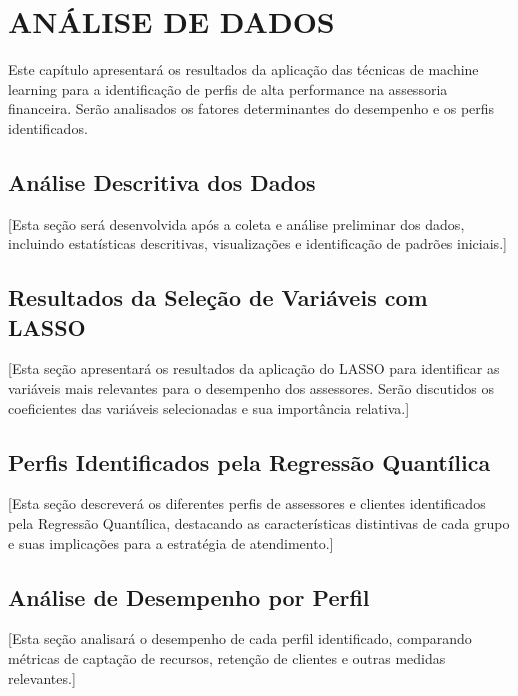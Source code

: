 \chapter{ANÁLISE DE DADOS}

Este capítulo apresentará os resultados da aplicação das técnicas de machine learning para a identificação de perfis de alta performance na assessoria financeira. Serão analisados os fatores determinantes do desempenho e os perfis identificados.

\section{Análise Descritiva dos Dados}

[Esta seção será desenvolvida após a coleta e análise preliminar dos dados, incluindo estatísticas descritivas, visualizações e identificação de padrões iniciais.]

\section{Resultados da Seleção de Variáveis com LASSO}

[Esta seção apresentará os resultados da aplicação do LASSO para identificar as variáveis mais relevantes para o desempenho dos assessores. Serão discutidos os coeficientes das variáveis selecionadas e sua importância relativa.]

\section{Perfis Identificados pela Regressão Quantílica}

[Esta seção descreverá os diferentes perfis de assessores e clientes identificados pela Regressão Quantílica, destacando as características distintivas de cada grupo e suas implicações para a estratégia de atendimento.]

\section{Análise de Desempenho por Perfil}

[Esta seção analisará o desempenho de cada perfil identificado, comparando métricas de captação de recursos, retenção de clientes e outras medidas relevantes.]